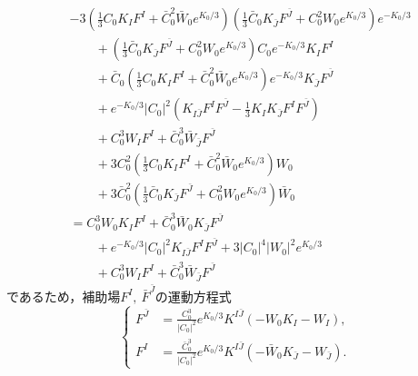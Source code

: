 \documentclass[a4paper,uplatex,dvipdfmx,10pt]{jsarticle}
\theoremstyle{definition}
\begin{document}
\begin{align}
   &
       -3
       \left(
           \frac{1}{3}C_{0}K_{I}F^{I}
           +
           \bar{C}_{0}^{2}\bar{W}_{0}e^{K_{0}/3}            
       \right)
       \left(
           \frac{1}{3}\bar{C}_{0}K_{\bar{J}}F^{\bar{J}}
           +
           C_{0}^{2}W_{0}e^{K_{0}/3}
       \right)
       e^{-K_{0}/3}
   \nonumber
   \\
   &\qquad
       +
       \left(
           \frac{1}{3}\bar{C}_{0}K_{\bar{J}}F^{\bar{J}}
           +
           C_{0}^{2}W_{0}e^{K_{0}/3}
       \right)
       C_{0}e^{-K_{0}/3}K_{I}F^{I}
   \nonumber
   \\
   &\qquad
       +
       \bar{C}_{0}
       \left(
           \frac{1}{3}C_{0}K_{I}F^{I}
           +
           \bar{C}_{0}^{2}\bar{W}_{0}e^{K_{0}/3}            
       \right)
       e^{-K_{0}/3}K_{\bar{J}}F^{\bar{J}}
   \nonumber
   \\
   &\qquad
       +
       e^{-K_{0}/3}|C_{0}|^2
       \left(
           K_{I\bar{J}}F^{I}F^{\bar{J}}
           -
           \frac{1}{3}K_{I}K_{\bar{J}}F^{I}F^{\bar{J}}
       \right)
   \nonumber   
   \\
   &\qquad
       +
       C_{0}^{3}W_{I}F^{I}
       +
       \bar{C}_{0}^{3}\bar{W}_{\bar{J}}F^{\bar{J}}
   \nonumber   
   \\
   &\qquad
       +
       3C_{0}^2
       \left(
           \frac{1}{3}C_{0}K_{I}F^{I}
           +
           \bar{C}_{0}^{2}\bar{W}_{0}e^{K_{0}/3}
       \right)
       W_{0}
   \nonumber   
   \\
   &\qquad
       +
       3\bar{C}_{0}^2
       \left(
           \frac{1}{3}\bar{C}_{0}K_{\bar{J}}F^{\bar{J}}
           +
           C_{0}^{2}W_{0}e^{K_{0}/3}
       \right)
       \bar{W}_{0}
   \nonumber
   \\
   &=
   C_{0}^{3}W_{0}K_{I}F^{I}
   +
   \bar{C}_{0}^{3}\bar{W}_{0}K_{\bar{J}}F^{\bar{J}}
   \nonumber
   \\
   &\qquad
   +
   e^{-K_{0}/3}
   |C_{0}|^2K_{I\bar{J}}F^{I}F^{\bar{J}}
   +
   3
   |C_{0}|^{4}|W_{0}|^{2}e^{K_{0}/3}
   \nonumber
   \\
   &\qquad
   +
   C_{0}^{3}W_{I}F^{I}
   +
   \bar{C}_{0}^3\bar{W}_{\bar{J}}F^{\bar{J}}
   \label{eqn_append3_5}
\end{align}
であるため，補助場$F^{I},\ \bar{F}^{\bar{J}}$の運動方程式
\begin{equation}
    \left\{
    \begin{alignedat}{1}
        F^{\bar{J}}
        &=
        \frac{C_{0}^{3}}{|C_{0}|^{2}}e^{K_{0}/3}K^{I\bar{J}}
        \left(
            -
            W_{0}K_{I}
            -
            W_{I}
        \right)
        ,
        \\
        F^{I}
        &=
        \frac{\bar{C}_{0}^{3}}{|C_{0}|^2}e^{K_{0}/3}K^{I\bar{J}}
        \left(
            -
            \bar{W}_{0}K_{\bar{J}}
            -
            W_{\bar{J}}
        \right)
        .            
    \end{alignedat}
    \right.
    \nonumber
\end{equation}
\end{document}
